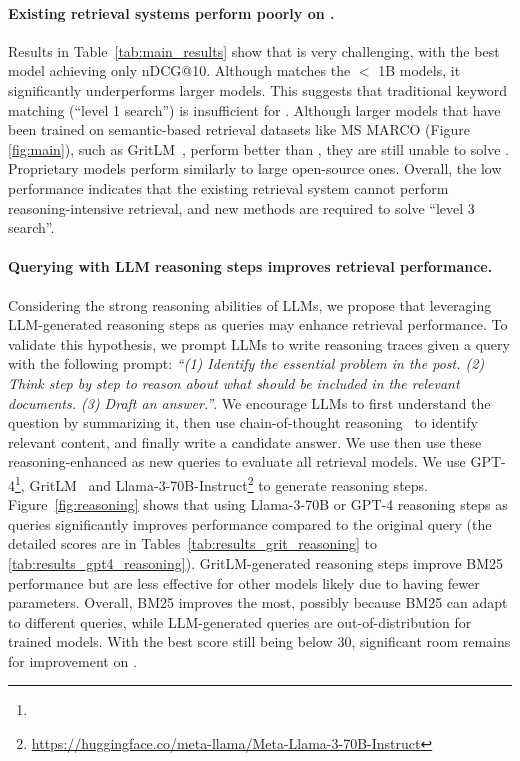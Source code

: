 \paragraph{Existing retrieval systems perform poorly on .} 
Results in Table~\ref{tab:main_results} show that \ours is very challenging, with the best model achieving only \bestperformance nDCG@10.
Although \bmtwentyfive matches the $<$ 1B models, it significantly underperforms larger models. 
This suggests that traditional keyword matching (``level 1 search'') is insufficient for \ours. 
Although larger models that have been trained on semantic-based retrieval datasets like MS MARCO (Figure \ref{fig:main}), such as GritLM~\citep{muennighoff2024generative}, perform better than \bmtwentyfive, they are still unable to solve \ours. 
Proprietary models perform similarly to large open-source ones. 
Overall, the low performance indicates that the existing retrieval system cannot perform reasoning-intensive retrieval, and new methods are required to solve ``level 3 search''.



\paragraph{Querying with LLM reasoning steps improves retrieval performance.} Considering the strong reasoning abilities of LLMs, we propose that leveraging LLM-generated reasoning steps as queries may enhance retrieval performance. To validate this hypothesis, we prompt LLMs to write reasoning traces given a query with the following prompt: \textit{``(1) Identify the essential problem in the post. (2) Think step by step to reason about what should be included in the relevant documents. (3) Draft an answer.''}. We encourage LLMs to first understand the question by summarizing it, then use chain-of-thought reasoning~\citep{wei2022chain} to identify relevant content, and finally write a candidate answer. We use then use these reasoning-enhanced as new queries to evaluate all retrieval models. We use GPT-4\footnote{}, 
GritLM~\citep{muennighoff2024generative} and Llama-3-70B-Instruct\footnote{\url{https://huggingface.co/meta-llama/Meta-Llama-3-70B-Instruct}} to generate reasoning steps. 
Figure~\ref{fig:reasoning} shows that using Llama-3-70B or GPT-4 reasoning steps as queries significantly improves performance compared to the original query (the detailed scores are in Tables~\ref{tab:results_grit_reasoning} to \ref{tab:results_gpt4_reasoning}). 
GritLM-generated reasoning steps improve BM25 performance but are less effective for other models likely due to having fewer parameters.
Overall, BM25 improves the most, possibly because BM25 can adapt to different queries, while LLM-generated queries are out-of-distribution for trained models. 
With the best score still being below 30, significant room remains for improvement on \ours.
 
